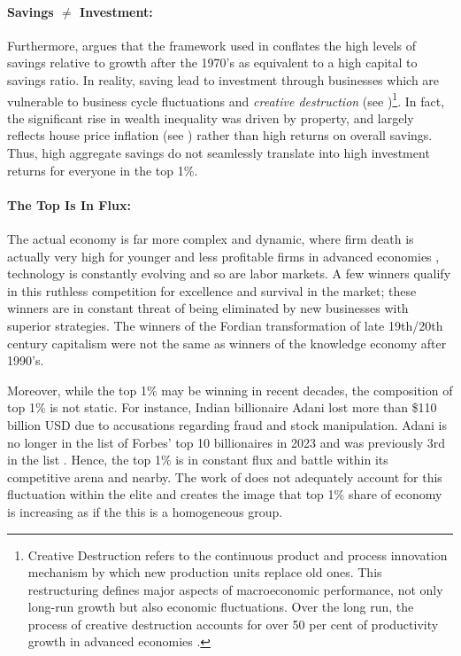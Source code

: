 \documentclass[12pt]{article}
\newcommand{\1}{\mathbbm 1}
\begin{document}
		
		
	
		
		\paragraph{Savings $\neq$ Investment:}
		
		Furthermore, \cite{soskice2014capital} argues that the framework used in \cite{piketty2017capital} conflates the high levels of savings relative to growth after the 1970's as equivalent to a high capital to savings ratio. In reality, saving lead to investment through businesses which are vulnerable to business cycle fluctuations and \textit{creative destruction} (see \cite{schumpeter1942})\footnote{Creative Destruction refers to the continuous product and process innovation mechanism by which new production units replace old ones. This restructuring defines major aspects of macroeconomic performance, not only long-run growth but also economic fluctuations. Over the long run, the process of creative destruction accounts for over 50 per cent of productivity growth in advanced economies \cite{soskice2014capital}.}. In fact, the significant rise in wealth inequality was driven by property, and largely reflects house price inflation (see \cite{bonnet2014does}) rather than high returns on overall savings. Thus, high aggregate savings do not seamlessly translate into high investment returns for everyone in the top 1\%. 
		
		
		\paragraph{The Top Is In Flux:}
		
		The actual economy is far more complex and dynamic, where firm death is actually very high for younger and less profitable firms in advanced economies \cite{mckenzie2019small}, technology is constantly evolving and so are labor markets. A few winners qualify in this ruthless competition for excellence and survival in the market; these winners are in constant threat of being eliminated by new businesses with superior strategies. The winners of the Fordian transformation of late 19th/20th century capitalism  were not the same as winners of the knowledge economy after 1990's.
		
		Moreover, while the top 1\% may be winning in recent decades, the composition of top 1\% is not static. For instance, Indian billionaire Adani lost more than \$110 billion USD due to accusations regarding fraud and stock manipulation. Adani is no longer in the list of Forbes' top 10 billionaires in 2023 and was previously 3rd in the list \cite{adani2023}. Hence, the top 1\% is in constant flux and battle within its competitive arena and nearby. The work of \cite{piketty2017capital} does not adequately account for this fluctuation within the elite and creates the image that top 1\% share of economy is increasing as if the this is a homogeneous group.
		
\end{document}
